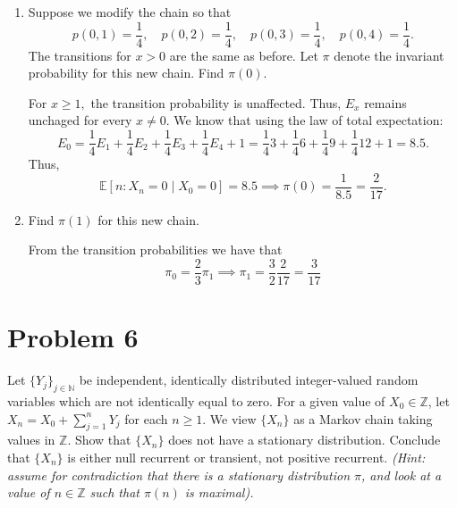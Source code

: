 \documentclass[11pt]{article}
\newcommand{\bbE}{\mathbb{E}}
\newcommand{\bbN}{\mathbb{N}}
\begin{document}
\begin{enumerate}[label=(\alph*)]
    \item Suppose we modify the chain so that
    \[
    p(0,1)=\frac{1}{4},\quad p(0,2)=\frac{1}{4},\quad p(0,3)=\frac{1}{4},\quad p(0,4)=\frac{1}{4}.
    \]
    The transitions for \(x>0\) are the same as before. Let \(\pi\) denote the invariant probability for this new chain. Find \(\pi(0)\).
\begin{solution}
    For $x\geq 1,$ the transition probability is unaffected. Thus, $E_x$ remains unchaged for every $x\neq 0.$ We know that using the law of total expectation:
    \[E_0 = \frac{1}{4}E_1 + \frac{1}{4}E_2 + \frac{1}{4}E_3 + \frac{1}{4}E_4 +1= \frac{1}{4}3 + \frac{1}{4}6 
+ \frac{1}{4}9 + \frac{1}{4}12 +1= 8.5.\] Thus, 
\[\bbE[n : X_n  = 0 \mid X_0 = 0] = 8.5 \implies \boxed{\pi(0) = \frac{1}{8.5}= \frac{2}{17}}.\]
\end{solution}
    
    \item Find \(\pi(1)\) for this new chain.
    \begin{solution}
        From the transition probabilities we have that 
        \[\pi_0 = \frac{2}{3}\pi_1 \implies \boxed{\pi_1 = \frac{3}{2}\frac{2}{17} = \frac{3}{17}}\]
    \end{solution}
\end{enumerate}

\newpage

\section*{Problem 6}
Let $\{Y_j\}_{j\in\bbN}$ be independent, identically distributed integer-valued random variables which are not identically equal to zero. For a given value of \(X_{0}\in\mathbb{Z}\), let \(X_{n}=X_{0}+\sum_{j=1}^{n}Y_{j}\) for each \(n\geq 1\). We view \(\{X_{n}\}\) as a Markov chain taking values in \(\mathbb{Z}\). Show that \(\{X_{n}\}\) does not have a stationary distribution. Conclude that \(\{X_{n}\}\) is either null recurrent or transient, not positive recurrent. \textit{(Hint: assume for contradiction that there is a stationary distribution \(\pi\), and look at a value of \(n\in\mathbb{Z}\) such that \(\pi(n)\) is maximal).}
\end{document}
